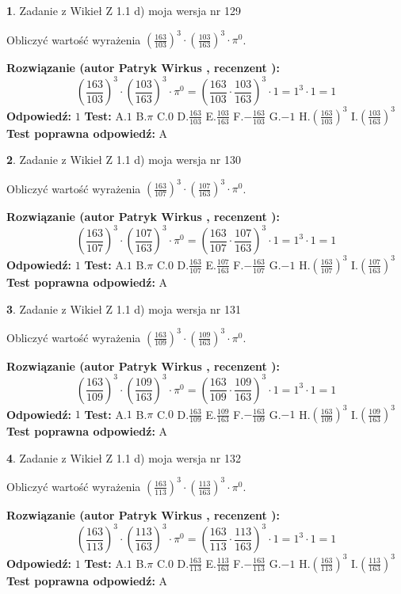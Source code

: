 \documentclass[12pt, a4paper]{article}
\theoremstyle{definition} %
\newtheorem{zad}{}
\newcommand{\zadStart}[1]{\begin{zad}#1\newline}
\newcommand{\zadStop}{\end{zad}}
\newcommand{\rozwStart}[2]{\noindent \textbf{Rozwiązanie (autor #1 , recenzent #2): }\newline}
\newcommand{\rozwStop}{\newline}
\newcommand{\odpStart}{\noindent \textbf{Odpowiedź:}\newline}
\newcommand{\odpStop}{\newline}
\newcommand{\testStart}{\noindent \textbf{Test:}\newline}
\newcommand{\testStop}{\newline}
\newcommand{\kluczStart}{\noindent \textbf{Test poprawna odpowiedź:}\newline}
\newcommand{\kluczStop}{\newline}
\begin{document}
\zadStart{Zadanie z Wikieł Z 1.1 d) moja wersja nr 129}

Obliczyć wartość wyrażenia $(\frac{163}{103})^{3} \cdot (\frac{103}{163})^{3} \cdot \pi^{0}$.
\zadStop
\rozwStart{Patryk Wirkus}{}
$$(\frac{163}{103})^{3} \cdot (\frac{103}{163})^{3} \cdot \pi^{0} = (\frac{163}{103} \cdot \frac{103}{163})^{3} \cdot 1 = 1^{3} \cdot 1 = 1$$
\rozwStop
\odpStart
$1$
\odpStop
\testStart
A.$1$ B.$\pi$ C.$0$ D.$\frac{163}{103}$ E.$\frac{103}{163}$
F.$-\frac{163}{103}$ G.$-1$
H.$(\frac{163}{103})^{3}$
I.$(\frac{103}{163})^{3}$
\testStop
\kluczStart
A
\kluczStop



\zadStart{Zadanie z Wikieł Z 1.1 d) moja wersja nr 130}

Obliczyć wartość wyrażenia $(\frac{163}{107})^{3} \cdot (\frac{107}{163})^{3} \cdot \pi^{0}$.
\zadStop
\rozwStart{Patryk Wirkus}{}
$$(\frac{163}{107})^{3} \cdot (\frac{107}{163})^{3} \cdot \pi^{0} = (\frac{163}{107} \cdot \frac{107}{163})^{3} \cdot 1 = 1^{3} \cdot 1 = 1$$
\rozwStop
\odpStart
$1$
\odpStop
\testStart
A.$1$ B.$\pi$ C.$0$ D.$\frac{163}{107}$ E.$\frac{107}{163}$
F.$-\frac{163}{107}$ G.$-1$
H.$(\frac{163}{107})^{3}$
I.$(\frac{107}{163})^{3}$
\testStop
\kluczStart
A
\kluczStop



\zadStart{Zadanie z Wikieł Z 1.1 d) moja wersja nr 131}

Obliczyć wartość wyrażenia $(\frac{163}{109})^{3} \cdot (\frac{109}{163})^{3} \cdot \pi^{0}$.
\zadStop
\rozwStart{Patryk Wirkus}{}
$$(\frac{163}{109})^{3} \cdot (\frac{109}{163})^{3} \cdot \pi^{0} = (\frac{163}{109} \cdot \frac{109}{163})^{3} \cdot 1 = 1^{3} \cdot 1 = 1$$
\rozwStop
\odpStart
$1$
\odpStop
\testStart
A.$1$ B.$\pi$ C.$0$ D.$\frac{163}{109}$ E.$\frac{109}{163}$
F.$-\frac{163}{109}$ G.$-1$
H.$(\frac{163}{109})^{3}$
I.$(\frac{109}{163})^{3}$
\testStop
\kluczStart
A
\kluczStop



\zadStart{Zadanie z Wikieł Z 1.1 d) moja wersja nr 132}

Obliczyć wartość wyrażenia $(\frac{163}{113})^{3} \cdot (\frac{113}{163})^{3} \cdot \pi^{0}$.
\zadStop
\rozwStart{Patryk Wirkus}{}
$$(\frac{163}{113})^{3} \cdot (\frac{113}{163})^{3} \cdot \pi^{0} = (\frac{163}{113} \cdot \frac{113}{163})^{3} \cdot 1 = 1^{3} \cdot 1 = 1$$
\rozwStop
\odpStart
$1$
\odpStop
\testStart
A.$1$ B.$\pi$ C.$0$ D.$\frac{163}{113}$ E.$\frac{113}{163}$
F.$-\frac{163}{113}$ G.$-1$
H.$(\frac{163}{113})^{3}$
I.$(\frac{113}{163})^{3}$
\testStop
\kluczStart
A
\kluczStop
\end{document}
